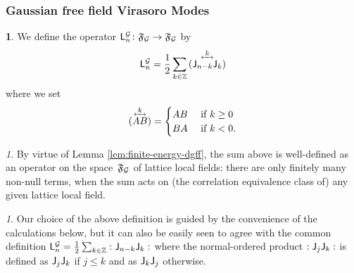 \documentclass[12pt,oneside,english]{amsart}
\numberwithin{equation}{section}
\numberwithin{figure}{section}
\theoremstyle{plain}
\theoremstyle{plain}
\theoremstyle{plain}
\theoremstyle{plain}
\theoremstyle{remark}
\newtheorem{rem}[thm]{\protect\remarkname}
\theoremstyle{definition}
\newtheorem{defn}[thm]{\protect\definitionname}
\theoremstyle{plain}
\theoremstyle{plain}
\numberwithin{thm}{section}
\newcommand{\kallemod}[1]{{\color{kallecol} {#1}}}
\providecommand{\definitionname}{Definition}
\providecommand{\remarkname}{Remark}
\providecommand{\definitionname}{Definition}
\providecommand{\remarkname}{Remark}
\providecommand{\definitionname}{Definition}
\providecommand{\remarkname}{Remark}
\providecommand{\definitionname}{Definition}
\providecommand{\remarkname}{Remark}
\begin{document}
\subsubsection{\label{subsec:gff-vir-modes}Gaussian free field Virasoro Modes}
\begin{defn}
We define the operator 
$\mathsf{L}_{n}^{\mathcal{G}} 
\colon \mathfrak{F}_{\mathcal{G}} \to \mathfrak{F}_{\mathcal{G}}$
by 
\[
\virL{n}^{\abbrDGFF}
    = \frac{1}{2} \sum_{k\in\Z}
    \ourorder{\currmode{n-k}}{\currmode{k}}{k}
\]
where we set
\begin{align*}
\ourorder{A}{B}{k} =
\begin{cases}
A B & \text{ if $k \geq 0$} \\
B A & \text{ if $k < 0$} .
\end{cases}
\end{align*}
\end{defn}

\begin{rem}
By virtue of Lemma \ref{lem:finite-energy-dgff},
the sum above is well-defined as an operator on the space~$\mathfrak{F}_{\mathcal{G}}$ of
lattice local fields: there are only finitely many non-null terms, when the sum 
acts on
(the correlation equivalence class of) any given
lattice local field.
\end{rem}

\begin{rem}
Our choice of the above definition is guided by the convenience of 
the calculations below, but it can also be easily seen to agree with the common
definition
$\mathsf{L}_{n}^{\mathcal{G}}
= {\frac{1}{2}\sum_{k\in\mathbb{Z} }: \mathsf{J}_{{n-k}} 
\mathsf{J}_{{k}}:}$
where the normal-ordered product ${: \mathsf{J}_{{j}} \mathsf{J}_{{k}}:}$ is defined as 
$\mathsf{J}_{{j}} \mathsf{J}_{{k}}$
if $j\leq k$ and as $\mathsf{J}_{{k}} \mathsf{J}_{{j}}$ otherwise. 
\end{rem}
\end{document}
